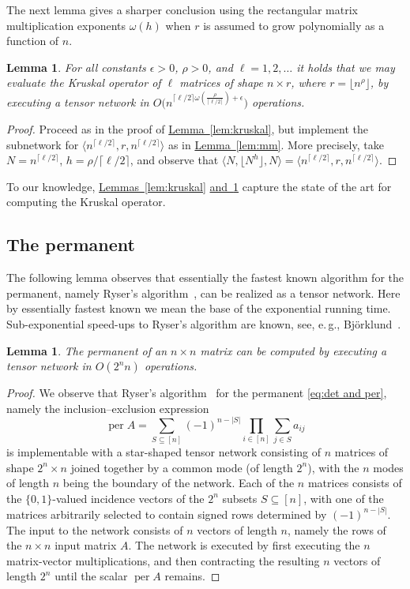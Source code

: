 \documentclass[11pt]{article}
\numberwithin{equation}{section}
\newtheorem{lemma}[theorem]{Lemma}
\theoremstyle{definition}
\theoremstyle{plain}
\newcommand{\eg}{e.\,g.}
\newcommand{\expref}[2]{\hyperref[#2]{#1~\ref{#2}}}
\newcommand{\bra}{\ensuremath{\langle}}
\newcommand{\ket}{\ensuremath{\rangle}}
\newcommand{\per}{\ensuremath{\operatorname{per}}}
\begin{document}
The next lemma gives a sharper conclusion using the rectangular matrix
multiplication exponents $\omega(h)$ when $r$ is assumed to grow
polynomially as a function of $n$.

\begin{lemma}
\label{lem:kruskal-2}
For all constants $\epsilon>0$, $\rho>0$, and $\ell=1,2,\ldots$
it holds that we may evaluate the Kruskal operator
of $\ell$ matrices of shape $n\times r$, where $r=\lfloor n^\rho\rfloor$,
by executing a tensor network in
$O\bigl(n^{\lceil\ell/2\rceil\omega\left(\frac{\rho}{\lceil\ell/2\rceil}\right)+\epsilon}\bigr)$ operations.
\end{lemma}
\begin{proof}
Proceed as in the proof of \expref{Lemma}{lem:kruskal}, but implement the subnetwork
for $\bra n^{\lceil\ell/2\rceil},r,n^{\lceil\ell/2\rceil}\ket$ as in
\expref{Lemma}{lem:mm}.
More precisely, take $N=n^{\lceil\ell/2\rceil}$, $h=\rho/\lceil\ell/2\rceil$,
and observe that
$\bra N,\lfloor N^h\rfloor,N\ket=\bra n^{\lceil\ell/2\rceil},r,n^{\lceil\ell/2\rceil}\ket$.
\end{proof}

To our knowledge,
%
\expref{Lemmas}{lem:kruskal} \expref{and}{lem:kruskal-2}  %
capture the state of the art for
computing the Kruskal operator.

\subsection{The permanent}

The following lemma observes that essentially the fastest known algorithm
for the permanent, namely Ryser's algorithm~\cite{Ryser1963}, can be
realized as a tensor network. Here by essentially fastest known we
mean the base of the exponential running time. Sub-exponential speed-ups
to Ryser's algorithm are known, see, \eg, Bj\"orklund~\cite{Bjorklund2016}.

\begin{lemma}
The permanent of an $n\times n$ matrix can be computed by executing
a tensor network in $O(2^nn)$ operations.
\end{lemma}
\begin{proof}
We observe that Ryser's algorithm~\cite{Ryser1963} for the
permanent \eqref{eq:det and per}, namely the inclusion--exclusion expression
\[
\per A=\sum_{S\subseteq [n]}(-1)^{n-|S|}\prod_{i\in [n]}\sum_{j\in S}a_{ij}
\]
is implementable with a star-shaped tensor network consisting of
$n$ matrices of shape $2^n\times n$ joined together by a common mode (of length $2^n$), with the $n$ modes of length $n$ being the boundary of the network.
Each of the $n$ matrices consists of the $\{0,1\}$-valued incidence vectors of
the $2^n$ subsets $S\subseteq [n]$, with one of the matrices arbitrarily
selected to contain signed rows determined by $(-1)^{n-|S|}$.
The input to the network consists of $n$ vectors of length $n$,
namely the rows of the $n\times n$ input matrix $A$. The network is executed
by first executing the $n$ matrix-vector multiplications, and then contracting
the resulting $n$ vectors of length $2^n$ until the scalar $\per A$ remains.
\end{proof}
\end{document}
